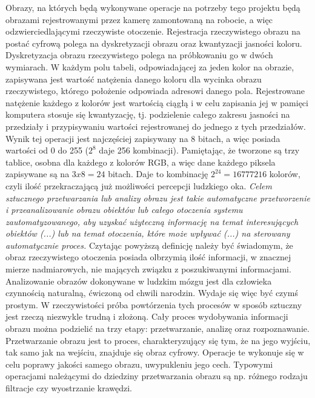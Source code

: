 Obrazy, na których będą wykonywane operacje na potrzeby tego projektu będą obrazami rejestrowanymi przez kamerę zamontowaną na robocie, a więc odzwierciedlającymi rzeczywiste otoczenie. Rejestracja rzeczywistego obrazu na postać cyfrową polega na dyskretyzacji obrazu oraz kwantyzacji jasności koloru\cite{Malina}. Dyskretyzacja obrazu rzeczywistego polega na próbkowaniu go w dwóch wymiarach. W każdym polu tabeli, odpowiadającej za jeden kolor na obrazie, zapisywana jest wartość natężenia danego koloru dla wycinka obrazu rzeczywistego, którego położenie odpowiada adresowi danego pola. Rejestrowane natężenie każdego z kolorów jest wartością ciągłą i w celu zapisania jej w pamięci komputera stosuje się kwantyzację, tj. podzielenie całego zakresu jasności na przedziały i przypisywaniu wartości rejestrowanej do jednego z tych przedziałów. Wynik tej operacji jest najczęściej zapisywany na 8 bitach, a więc posiada wartości od 0 do 255 ($2^8$ daje 256 kombinacji). Pamiętając, że tworzone są trzy tablice, osobna dla każdego z kolorów RGB, a więc dane każdego piksela zapisywane są na $3 x 8 = 24$ bitach. Daje to kombinację $2^{24} = 16777216$ kolorów, czyli ilość przekraczającą już możliwości percepcji ludzkiego oka.
\textit{Celem sztucznego przetwarzania lub analizy obrazu jest takie automatyczne przetworzenie i przeanalizowanie obrazu obiektów lub całego otoczenia systemu zautomatyzowanego, aby uzyskać użyteczną informację na temat interesujących obiektów (...) lub na temat otoczenia, które może wpływać (...) na sterowany automatycznie proces.}\cite{Tadeusiewicz}
Czytając powyższą definicję należy być świadomym, że obraz rzeczywistego otoczenia posiada olbrzymią ilość informacji, w znacznej mierze nadmiarowych, nie mających związku z poszukiwanymi informacjami. Analizowanie obrazów dokonywane w ludzkim mózgu jest dla człowieka czynnością naturalną, ćwiczoną od chwili narodzin. Wydaje się więc być czymś prostym. W rzeczywistości próba powtórzenia tych procesów w sposób sztuczny jest rzeczą niezwykle trudną i złożoną. Cały proces wydobywania informacji obrazu można podzielić na trzy etapy: przetwarzanie, analizę oraz rozpoznawanie.
Przetwarzanie obrazu jest to proces, charakteryzujący się tym, że na jego wyjściu, tak samo jak na wejściu, znajduje się obraz cyfrowy. Operacje te wykonuje się w celu poprawy jakości samego obrazu, uwypukleniu jego cech. Typowymi operacjami należącymi do dziedziny przetwarzania obrazu są np. różnego rodzaju filtracje czy wyostrzanie krawędzi.
